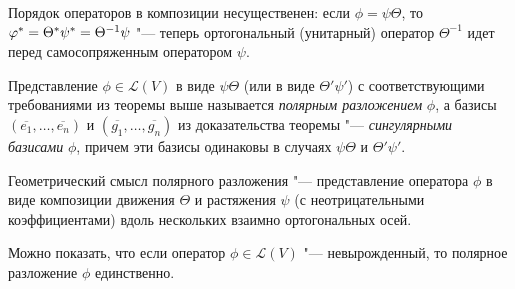 \begin{note}
	Порядок операторов в композиции несущественен: если $\phi = \psi\Theta$, то $\phi^* \hm= \Theta^*\psi^* = \Theta^{-1}\psi$ "--- теперь ортогональный (унитарный) оператор $\Theta^{-1}$ идет перед самосопряженным оператором $\psi$.
\end{note}

\begin{definition}
	Представление $\phi \in \mathcal{L}(V)$ в виде $\psi\Theta$ (или в виде $\Theta'\psi'$) с соответствующими требованиями из теоремы выше называется \textit{полярным разложением} $\phi$, а базисы $(\overline{e_1}, \dots, \overline{e_n})$ и $(\overline{g_1}, \dots, \overline{g_n})$ из доказательства теоремы "--- \textit{сингулярными базисами} $\phi$, причем эти базисы одинаковы в случаях $\psi\Theta$ и $\Theta'\psi'$.
\end{definition}

\begin{note}
	Геометрический смысл полярного разложения "--- представление оператора $\phi$ в виде композиции движения $\Theta$ и растяжения $\psi$ (с неотрицательными коэффициентами) вдоль нескольких взаимно ортогональных осей.
\end{note}

\begin{note}
	Можно показать, что если оператор $\phi \in \mathcal{L}(V)$ "--- невырожденный, то полярное разложение $\phi$ единственно.
\end{note}